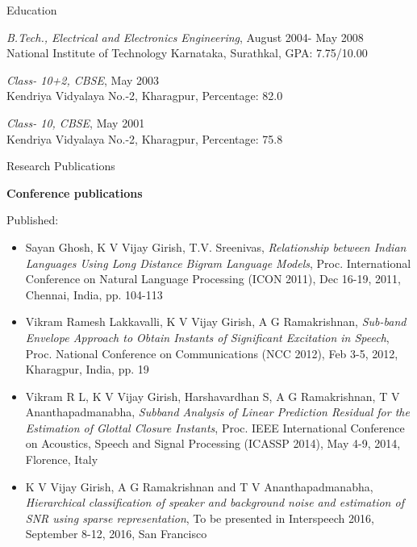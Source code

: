 \documentclass[10pt]{article}
\newenvironment{subbulletlist}{%
	\begin{list}{\labelitemii}{%
		\setlength{\topsep}{\itemsep}\setlength{\parskip}{\parsep}%
	}%
}%
{ \end{list} }
\begin{document}
\begin{cv}
\begin{cvlist}{Education}
\begin{subbulletlist}
	\end{subbulletlist}
	\item \emph{B.Tech., Electrical and Electronics Engineering}, August 2004- May 2008\\
	National Institute of Technology Karnataka, Surathkal, GPA: 7.75/10.00
	\item \emph{Class- 10+2, CBSE}, May 2003 \\
	Kendriya Vidyalaya No.-2, Kharagpur, Percentage: 82.0
	\item \emph{Class- 10, CBSE}, May 2001 \\
	Kendriya Vidyalaya No.-2, Kharagpur, Percentage: 75.8
\end{cvlist}


\begin{cvlist}{Research Publications}
\item \textbf{Conference publications}
\item Published:
	\begin{itemize}\itemsep=0.25em
	\item Sayan Ghosh, K V Vijay Girish, T.V. Sreenivas, \textit{Relationship between Indian Languages Using Long Distance Bigram Language Models}, Proc. International Conference on Natural Language Processing (ICON
2011), Dec 16-19, 2011, Chennai, India, pp. 104-113


\item
Vikram Ramesh Lakkavalli, K V Vijay Girish, A G Ramakrishnan, \textit{Sub-band Envelope Approach to Obtain Instants of Significant Excitation in Speech}, Proc. National Conference on Communications (NCC 2012), Feb 3-5, 2012, Kharagpur, India, pp. 19

\item Vikram R L, K V Vijay Girish, Harshavardhan S, A G Ramakrishnan, T V Ananthapadmanabha, 
\textit{Subband Analysis of Linear Prediction Residual for the Estimation of Glottal Closure Instants}, Proc. IEEE International Conference on Acoustics, Speech and Signal Processing (ICASSP 2014), May 4-9, 2014, Florence, Italy

\item	K V Vijay Girish, A G Ramakrishnan and T V Ananthapadmanabha, \textit{Hierarchical classification of speaker and background noise and estimation of SNR using sparse representation}, To be presented in Interspeech 2016, September 8-12, 2016, San Francisco
	\end{itemize}
	


\end{cvlist}


\end{cv}
\end{document}
